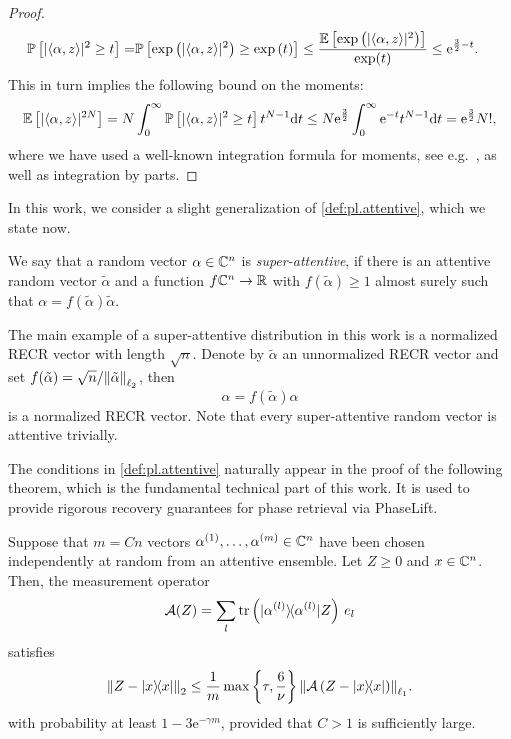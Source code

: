 \begin{proof}
  \begin{align}
    \mathbb{P} \left[ | \langle \alpha, z \rangle|^2 \geq t \right]
    =& \mathbb{P} \left[ \exp \left( | \langle  \alpha, z \rangle|^2 \right) \geq \exp \left( t \right) \right]
    \leq \frac{ \mathbb{E} \left[ \exp \left( | \langle \alpha,  z \rangle|^2 \right) \right]}{\exp (t)} \leq \mathrm{e}^{\frac{3}{2}-t}.
  \end{align}
  This in turn implies the following bound on the moments:
  \begin{align}
    \mathbb{E} \left[ | \langle  \alpha, z \rangle|^{2N} \right]
    =  N \int_0^\infty \mathbb{P}\left[ | \langle  \alpha, z \rangle|^2\geq t \right] t^{N-1} \mathrm{d}t \leq N \mathrm{e}^{\frac{3}{2}} \int_0^\infty \mathrm{e}^{-t} t^{N-1} \mathrm{d}t
    = \mathrm{e}^{\frac{3}{2}} N!,
  \end{align}
  where we have used a well-known integration formula for moments, see e.g.\ \cite[Prop.~7.1]{Foucart_2013_Mathematical}, as well as integration by parts.
\end{proof}

In this work, we consider a slight generalization of \cref{def:pl.attentive}, which we state now.
\begin{definition}%
  \label{def:pl.super_attentitive}
  We say that a random vector $\alpha \in {\mathbb{C}}^n$ is \emph{super-attentive}, if there is an attentive random vector $\tilde\alpha$ and a function $f {\mathbb{C}}^n \to {\mathbb{R}}$ with $f(\tilde\alpha) \ge 1$ almost surely such that $\alpha = f(\tilde\alpha) \tilde \alpha$.
\end{definition}
The main example of a super-attentive distribution in this work is a normalized RECR vector with length $\sqrt{n}$.
Denote by $\tilde\alpha$ an unnormalized RECR vector and set $f(\tilde\alpha) = \sqrt{n} / {\Vert\tilde\alpha\Vert}_{\ell_2}$, then
\[
  \alpha = f(\tilde\alpha) \alpha
  \label{eq:pl.normalized_recr}
\]
is a normalized RECR vector.
Note that every super-attentive random vector is attentive trivially.

The conditions in \cref{def:pl.attentive} naturally appear in the proof of the following theorem, which is the fundamental technical part of this work.
It is used to provide rigorous recovery guarantees for phase retrieval via PhaseLift.

\begin{proposition}%
  \label{prop:pl.nsp}
  Suppose that $m = Cn$ vectors $\alpha^{(1)},\ldots,\alpha^{(m)} \in \mathbb{C}^n$ have been chosen independently at random from an attentive ensemble.
  Let $Z\geq 0$ and $x \in {\mathbb{C}}^n$.
  Then, the measurement operator
  \[
    \label{eq:pl.measurement_operator_rank1}
    \mathcal{A}(Z) = \sum_l \tr \left(\ketbra{\alpha\ind{l}}  Z\right) \, {e_l}
  \]
  satisfies
  \[
    \label{eq:pl.rec_guarantee_nsp}
    \Fnorm{Z - \ketbra{x}}
    \leq \frac{1}{m} \max \left\{ \tau, \frac{6}{\nu} \right\}  \Norm{\mathcal{A}\left( Z - \ketbra{x} \right)}_{\ell_1}.
  \]
  with probability at least $1- 3\mathrm{e}^{-\gamma m}$, provided that $C >1$ is sufficiently large.
\end{proposition}

